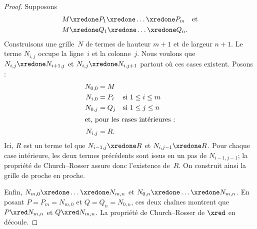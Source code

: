\documentclass[../../../include/open-logic-section]{subfiles}
\begin{document}
\begin{proof}
Supposons
\begin{align*}
  M & \xredone P_1 \xredone \dots \xredone P_m
    \quad\text{et}\\
  M & \xredone Q_1 \xredone \dots \xredone Q_n.
\end{align*}
Construisons une grille~$N$ de termes de
hauteur $m+1$ et de largeur $n+1$.
Le terme $N_{i,j}$ occupe la ligne~$i$
et la colonne~$j$. Nous voulons que
$N_{i,j}\xredone N_{i+1,j}$ et
$N_{i,j}\xredone N_{i,j+1}$ partout où
ces cases existent. Posons :
\begin{align*}
  N_{0,0} &= M \\
  N_{i,0} &= P_i && \text{si }1\le i\le m \\
  N_{0,j} &= Q_j && \text{si }1\le j\le n \\
  \intertext{et, pour les cases intérieures :}
  N_{i,j} &= R.
\end{align*}
Ici, $R$ est un terme tel que
$N_{i-1,j}\xredone R$ et
$N_{i,j-1}\xredone R$. Pour chaque case
intérieure, les deux termes précédents
sont issus en un pas de $N_{i-1,j-1}$;
la propriété de Church--Rosser assure
donc l'existence de~$R$. On construit
ainsi la grille de proche en proche.

Enfin, $N_{m,0}\xredone\dots\xredone N_{m,n}$
et $N_{0,n}\xredone\dots\xredone N_{m,n}$.
En posant $P=P_m=N_{m,0}$ et
$Q=Q_n=N_{0,n}$, ces deux chaînes montrent
que $P\xred N_{m,n}$ et $Q\xred N_{m,n}$.
La propriété de Church--Rosser de $\xred$
en découle.
\end{proof}
\end{document}

